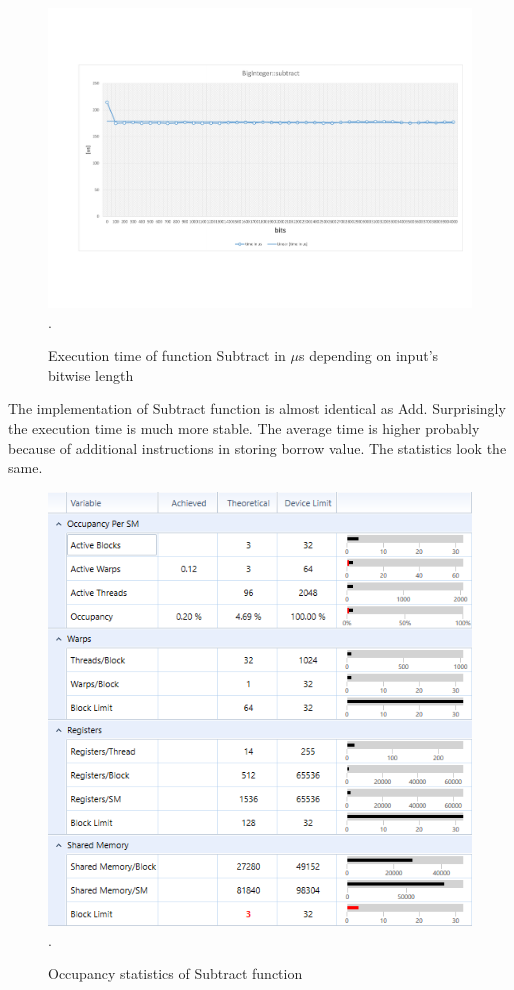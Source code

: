 \documentclass[oneside,openright,12pt,final,en]{mgr}
\begin{document}
\begin{figure}[H]
	\centering
	\includegraphics[width=\textwidth,trim={0.5cm 2.8cm 0.4cm 2.8cm},clip]{subtract.pdf}.
	\caption{Execution time of function Subtract in $\mu$s depending on input's bitwise length}
	\label{fig:subtract}
\end{figure}

The implementation of Subtract function is almost identical as Add. Surprisingly the execution time is much more stable. The average time is higher probably because of additional instructions in storing borrow value. The statistics look the same.

\begin{figure}[H]
	\centering
	\includegraphics[width=\textwidth]{subtract_occupancy}.
	\caption{Occupancy statistics of Subtract function}
	\label{fig:subtract_occupancy}
\end{figure}
\end{document}
